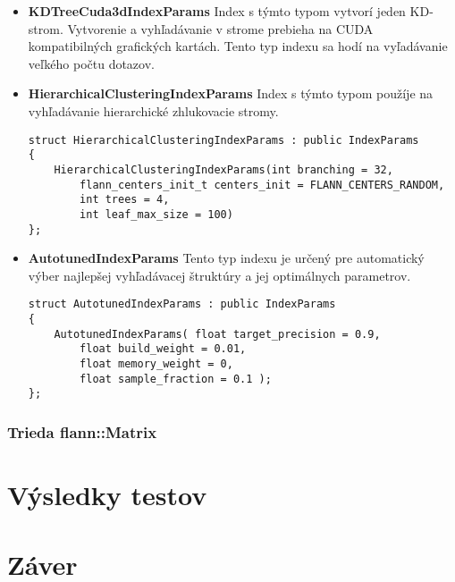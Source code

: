 \documentclass[12pt,oneside]{fithesis2}
\begin{document}
\begin{itemize}
\item \textbf{KDTreeCuda3dIndexParams} Index s týmto typom vytvorí jeden KD-strom. Vytvorenie a vyhľadávanie v strome prebieha na CUDA kompatibilných grafických kartách. Tento typ indexu sa hodí na vyľadávanie veľkého počtu dotazov.

\item \textbf{HierarchicalClusteringIndexParams} Index s týmto typom použíje na vyhľadávanie hierarchické zhlukovacie stromy.
{\scriptsize
\begin{lstlisting}
struct HierarchicalClusteringIndexParams : public IndexParams
{
	HierarchicalClusteringIndexParams(int branching = 32,
		flann_centers_init_t centers_init = FLANN_CENTERS_RANDOM,
		int trees = 4, 
		int leaf_max_size = 100)
};
\end{lstlisting}}
\item \textbf{AutotunedIndexParams} Tento typ indexu je určený pre automatický výber najlepšej vyhľadávacej štruktúry a jej optimálnych parametrov. 
{\scriptsize
\begin{lstlisting}
struct AutotunedIndexParams : public IndexParams
{
	AutotunedIndexParams( float target_precision = 0.9,
		float build_weight = 0.01,
		float memory_weight = 0,
		float sample_fraction = 0.1 );
};
\end{lstlisting}}

\end{itemize}



	\subsection{Trieda flann::Matrix} 	

    \chapter{Výsledky testov}

    \chapter{Záver}
    

{}

\end{document}
